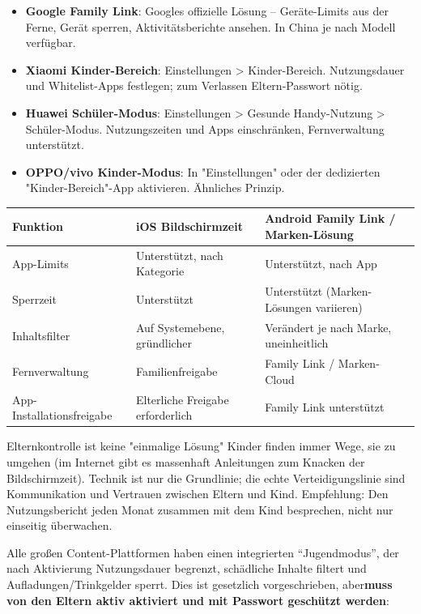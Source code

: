 \begin{itemize}
  \item \textbf{Google Family Link}: Googles offizielle Lösung – Geräte-Limits aus der Ferne, Gerät sperren, Aktivitätsberichte ansehen. In China je nach Modell verfügbar.
  \item \textbf{Xiaomi Kinder-Bereich}: Einstellungen > Kinder-Bereich. Nutzungsdauer und Whitelist-Apps festlegen; zum Verlassen Eltern-Passwort nötig.
  \item \textbf{Huawei Schüler-Modus}: Einstellungen > Gesunde Handy-Nutzung > Schüler-Modus. Nutzungszeiten und Apps einschränken, Fernverwaltung unterstützt.
  \item \textbf{OPPO/vivo Kinder-Modus}: In "Einstellungen" oder der dedizierten "Kinder-Bereich"-App aktivieren. Ähnliches Prinzip.
\end{itemize}

\begin{center}
\begin{tabularx}{\linewidth}{|X|X|X|}
\hline
\textbf{Funktion} & \textbf{iOS Bildschirmzeit} & \textbf{Android Family Link / Marken-Lösung} \tabularnewline
\hline
App-Limits & Unterstützt, nach Kategorie & Unterstützt, nach App \tabularnewline
Sperrzeit & Unterstützt & Unterstützt (Marken-Lösungen variieren) \tabularnewline
Inhaltsfilter & Auf Systemebene, gründlicher & Verändert je nach Marke, uneinheitlich \tabularnewline
Fernverwaltung & Familienfreigabe & Family Link / Marken-Cloud \tabularnewline
App-Installationsfreigabe & Elterliche Freigabe erforderlich & Family Link unterstützt \tabularnewline
\hline
\end{tabularx}
\end{center}

\begin{tcbwarn}{Elternkontrolle ist keine "einmalige Lösung"}
Kinder finden immer Wege, sie zu umgehen (im Internet gibt es massenhaft Anleitungen zum Knacken der Bildschirmzeit). Technik ist nur die Grundlinie; die echte Verteidigungslinie sind Kommunikation und Vertrauen zwischen Eltern und Kind. Empfehlung: Den Nutzungsbericht jeden Monat zusammen mit dem Kind besprechen, nicht nur einseitig überwachen.

\end{tcbwarn}


Alle großen Content-Plattformen haben einen integrierten “Jugendmodus”, der nach Aktivierung Nutzungsdauer begrenzt, schädliche Inhalte filtert und Aufladungen/Trinkgelder sperrt. Dies ist gesetzlich vorgeschrieben, aber\textbf{muss von den Eltern aktiv aktiviert und mit Passwort geschützt werden}:

